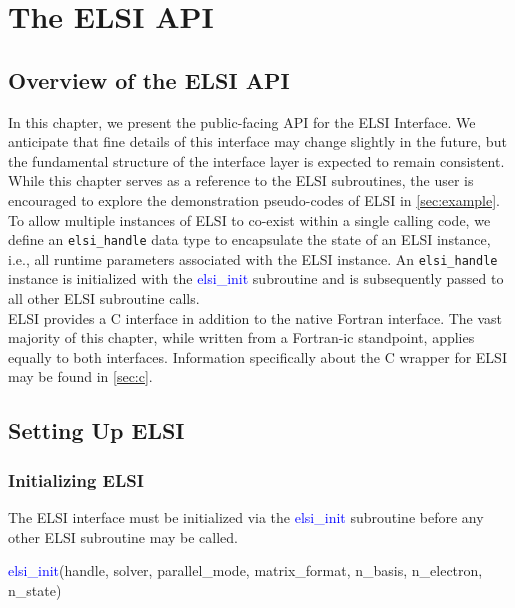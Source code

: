 \documentclass{report}
\begin{document}
\chapter{The ELSI API}
\section{Overview of the ELSI API}
\label{sec:api}

In this chapter, we present the public-facing API for the ELSI Interface.  We anticipate that fine details of this interface may change slightly in the future, but the fundamental structure of the interface layer is expected to remain consistent.  While this chapter serves as a reference to the ELSI subroutines, the user is encouraged to explore the demonstration pseudo-codes of ELSI in \ref{sec:example}.\\

To allow multiple instances of ELSI to co-exist within a single calling code, we define an \texttt{elsi\_handle} data type to encapsulate the state of an ELSI instance, i.e., all runtime parameters associated with the ELSI instance.  An \texttt{elsi\_handle} instance is initialized with the \textcolor{blue}{elsi\_init} subroutine and is subsequently passed to all other ELSI subroutine calls.\\

ELSI provides a C interface in addition to the native Fortran interface.  The vast majority of this chapter, while written from a Fortran-ic standpoint, applies equally to both interfaces.  Information specifically about the C wrapper for ELSI may be found in \ref{sec:c}.\\

\section{Setting Up ELSI}
\label{sec:setup}
\subsection{Initializing ELSI}
\label{subsec:setup_init}
The ELSI interface must be initialized via the \textcolor{blue}{elsi\_init} subroutine before any other ELSI subroutine may be called.\\

\begin{labeling}{\hspace{6cm}}
\item [\hspace{0.3cm} \textcolor{blue}{elsi\_init}(handle, solver, parallel\_mode, matrix\_format, n\_basis, n\_electron, n\_state)]
\end{labeling}
\end{document}
